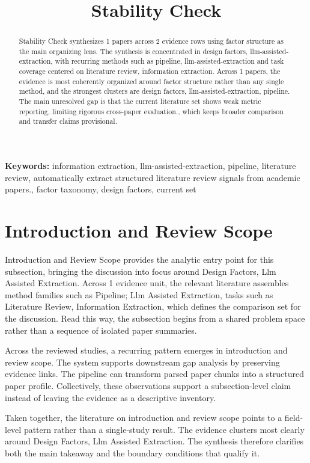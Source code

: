 \documentclass{article}
\title{Stability Check}
\begin{document}
\maketitle
\begin{abstract}
Stability Check synthesizes 1 papers across 2 evidence rows using factor structure as the main organizing lens. The synthesis is concentrated in design factors, llm-assisted-extraction, with recurring methods such as pipeline, llm-assisted-extraction and task coverage centered on literature review, information extraction. Across 1 papers, the evidence is most coherently organized around factor structure rather than any single method, and the strongest clusters are design factors, llm-assisted-extraction, pipeline. The main unresolved gap is that the current literature set shows weak metric reporting, limiting rigorous cross-paper evaluation., which keeps broader comparison and transfer claims provisional.
\end{abstract}
\noindent\textbf{Keywords:} information extraction, llm-assisted-extraction, pipeline, literature review, automatically extract structured literature review signals from academic papers., factor taxonomy, design factors, current set
\section{Introduction and Review Scope}
Introduction and Review Scope provides the analytic entry point for this subsection, bringing the discussion into focus around Design Factors, Llm Assisted Extraction. Across 1 evidence unit, the relevant literature assembles method families such as Pipeline; Llm Assisted Extraction, tasks such as Literature Review, Information Extraction, which defines the comparison set for the discussion. Read this way, the subsection begins from a shared problem space rather than a sequence of isolated paper summaries. \cite{01_2001_hamed_safety_science}

Across the reviewed studies, a recurring pattern emerges in introduction and review scope. The system supports downstream gap analysis by preserving evidence links. The pipeline can transform parsed paper chunks into a structured paper profile. Collectively, these observations support a subsection-level claim instead of leaving the evidence as a descriptive inventory. \cite{01_2001_hamed_safety_science}

Taken together, the literature on introduction and review scope points to a field-level pattern rather than a single-study result. The evidence clusters most clearly around Design Factors, Llm Assisted Extraction. The synthesis therefore clarifies both the main takeaway and the boundary conditions that qualify it. \cite{01_2001_hamed_safety_science}
\end{document}
